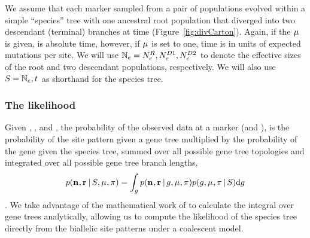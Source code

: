 We assume that each marker sampled from a pair of populations evolved within a
simple ``species'' tree with one ancestral root population that diverged into
two descendant (terminal) branches at time \comparisondivtime
(Figure~\ref{fig:divCarton}).
Again, if the $\murate$ is given, \comparisondivtime is absolute time, however,
if $\murate$ is set to one, time is in units of expected mutations per site.
We will use
$\comparisonpopsizes = \epopsize[\rootpopindex],
\epopsize[\descendantpopindex{1}], \epopsize[\descendantpopindex{2}]$
to denote
the effective sizes of the root and two descendant populations, respectively.
We will also use $\sptree = \comparisonpopsizes, \comparisondivtime$ as
shorthand for the species tree.

\subsubsection{The likelihood}

Given \murate, \gfreq, \comparisondivtime and \comparisonpopsizes, the
probability of the observed data at a marker (\allelecount and \redallelecount),
is the probability of the site pattern given a gene tree multiplied by the
probability of the gene given the species tree, summed over all possible gene
tree topologies and integrated over all possible gene tree branch lengths,
\begin{equation}
    \pr(\leafallelecounts, \leafredallelecounts \given \sptree, \murate, \gfreq)
    =
    \int_{\genetree}
    \pr(\leafallelecounts, \leafredallelecounts \given \genetree, \murate, \gfreq)
    \pr(\genetree, \murate, \gfreq \given \sptree)
    \diff{\genetree}
    \label{eq:markerlikelihood}
\end{equation}
\citep{Felsenstein1988,Nielsen2001,Rannala2003}.
We take advantage of the mathematical work of \citep{Bryant2012} to calculate
the integral over gene trees analytically, allowing us to compute the
likelihood of the species tree directly from the biallelic site patterns under
a coalescent model.

